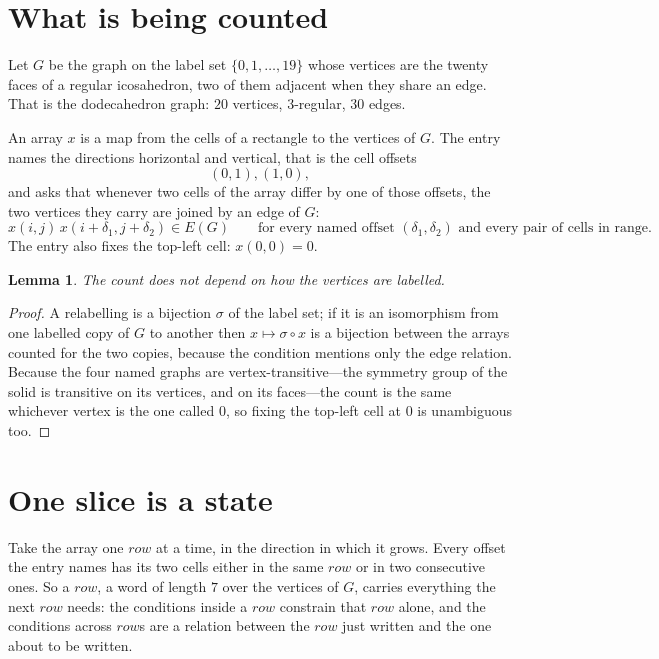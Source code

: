 \documentclass[11pt,a4paper]{article}
\theoremstyle{plain}
\newtheorem{lemma}[theorem]{Lemma}
\theoremstyle{definition}
\begin{document}
\section{What is being counted}

Let $G$ be the graph on the label set $\{0,1,\dots,19\}$ whose vertices are the twenty faces of a regular icosahedron, two of them adjacent when they share an edge. That is the dodecahedron graph: $20$ vertices, $3$-regular, $30$ edges.

An array $x$ is a map from the cells of a rectangle to the vertices of $G$. The entry names the
directions horizontal and vertical, that is the cell offsets
\[
(0,1), (1,0),
\]
and asks that whenever two cells of the array differ by one of those offsets, the two vertices
they carry are joined by an edge of $G$:
\[
x(i,j)\,x(i+\delta_1,j+\delta_2)\in E(G)\qquad
\text{for every named offset } (\delta_1,\delta_2)\text{ and every pair of cells in range.}
\]
The entry also fixes the top-left cell: $x(0,0)=0$.

\begin{lemma}\label{lem:label}
The count does not depend on how the vertices are labelled.
\end{lemma}

\begin{proof}
A relabelling is a bijection $\sigma$ of the label set; if it is an isomorphism from one
labelled copy of $G$ to another then $x\mapsto\sigma\circ x$ is a bijection between the arrays
counted for the two copies, because the condition mentions only the edge relation.
Because the four named graphs are vertex-transitive---the symmetry group of the solid is transitive on its vertices, and on its faces---the count is the same whichever vertex is the one called $0$, so fixing the top-left cell at $0$ is unambiguous too.
\end{proof}

\section{One slice is a state}

Take the array one $row$ at a time, in the direction in which it grows.
Every offset the entry names has its two cells either in the same $row$ or in two
consecutive ones. So a $row$, a word of length $7$ over the vertices of $G$, carries
everything the next $row$ needs: the conditions inside a $row$ constrain that
$row$ alone, and the conditions across $row$s are a relation between the
$row$ just written and the one about to be written.
\end{document}
